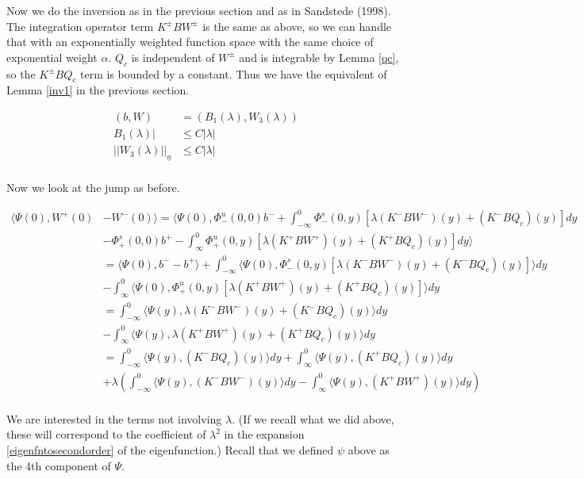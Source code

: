 \documentclass[12pt]{article}
\begin{document}
Now we do the inversion as in the previous section and as in Sandstede (1998). The integration operator term $K^\pm B W^\pm$ is the same as above, so we can handle that with an exponentially weighted function space with the same choice of exponential weight $\alpha$. $Q_c$ is independent of $W^\pm$ and is integrable by Lemma \ref{qc}, so the $K^\pm B Q_c$ term is bounded by a constant. Thus we have the equivalent of Lemma \ref{inv1} in the previous section.

\begin{align*}
(b, W) &= (B_1(\lambda), W_3(\lambda))\\
B_1(\lambda)| &\leq C|\lambda|\\
||W_3(\lambda)||_\eta &\leq C|\lambda|\\
\end{align*}

Now we look at the jump as before. 

\begin{align*}
\langle \Psi(0), W^+(0) &- W^-(0) \rangle = \langle \Psi(0), \Phi^u_-(0, 0)b^- + \int_{-\infty}^0 \Phi^s_-(0, y)[\lambda (K^- B W^-)(y) + (K^- B Q_c)(y)] dy  \\
&- \Phi^s_+(0, 0)b^+ - \int_\infty^0 \Phi^u_+(0, y)[\lambda (K^+ B W^+)(y) + (K^+ B Q_c)(y) ] dy \rangle \\
&= \langle \Psi(0), b^- - b^+\rangle + \int_{-\infty}^0 \langle \Psi(0), \Phi^s_-(0, y)[\lambda (K^- B W^-)(y) + (K^- B Q_c)(y) ] \rangle dy  \\
&- \int_\infty^0 \langle \Psi(0), \Phi^u_+(0, y)[\lambda (K^+ B W^+)(y) + (K^+ B Q_c)(y) ] \rangle dy  \\
&= \int_{-\infty}^0 \langle \Psi(y), \lambda (K^- B W^-)(y) + (K^- B Q_c)(y) \rangle dy \\
&- \int_\infty^0 \langle \Psi(y), \lambda (K^+ B W^+)(y) + (K^+ B Q_c)(y) \rangle dy \\
&= \int_{-\infty}^0 \langle \Psi(y), (K^- B Q_c)(y) \rangle dy + \int_{\infty}^0 \langle \Psi(y), (K^+ B Q_c)(y) \rangle dy  \\
&+ \lambda\left( \int_{-\infty}^0 \langle \Psi(y), (K^- B W^-)(y) \rangle dy - \int_\infty^0 \langle \Psi(y), (K^+ B W^+)(y) \rangle dy \right) \\
\end{align*}

We are interested in the terms not involving $\lambda$. (If we recall what we did above, these will correspond to the coefficient of $\lambda^2$ in the expansion \eqref{eigenfntosecondorder} of the eigenfunction.) Recall that we defined $\psi$ above as the 4th component of $\Psi$. 
\end{document}
